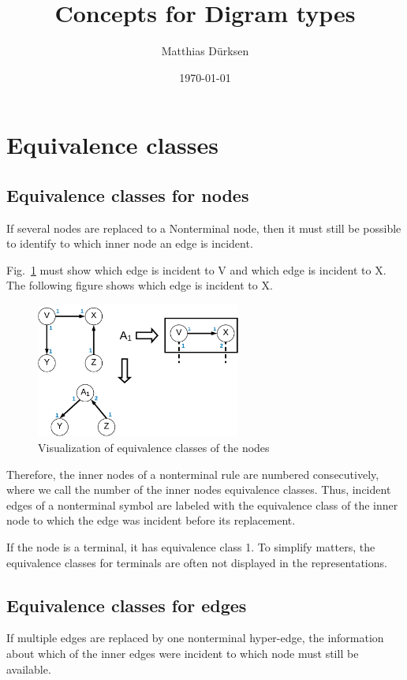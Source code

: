 \documentclass[a4paper]{scrartcl}
\title{Concepts for Digram types}
\author{Matthias Dürksen}
\date{\today}
\begin{document}
\maketitle
\section*{Equivalence classes}
\subsection*{Equivalence classes for nodes}

If several nodes are replaced to a Nonterminal node, then it must still be possible to identify to which inner node an edge is incident.

Fig.~\ref{fig:nodeEC} must show which edge is incident to V and which edge is incident to X. The following figure shows which edge is incident to X.
\begin{figure}[h]
	\centering
	\includegraphics[width=0.6\textwidth]{img/nodeEC}
	\caption{Visualization of equivalence classes of the nodes}
	\label{fig:nodeEC}
\end{figure}

Therefore, the inner nodes of a nonterminal rule are numbered consecutively, where we call the number of the inner nodes equivalence classes. Thus, incident edges of a nonterminal symbol are labeled with the equivalence class of the inner node to which the edge was incident before its replacement. 

If the node is a terminal, it has equivalence class 1. To simplify matters, the equivalence classes for terminals are often not displayed in the representations.

\subsection*{Equivalence classes for edges}
If multiple edges are replaced by one nonterminal hyper-edge, the information about which of the inner edges were incident to which node must still be available.
\end{document}
